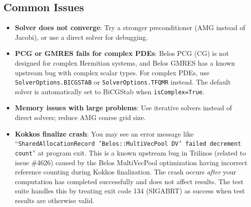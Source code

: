 \subsection{Common Issues}
\begin{itemize}
\item \textbf{Solver does not converge}: Try a stronger preconditioner (AMG instead of Jacobi), or use a direct solver for debugging.
\item \textbf{PCG or GMRES fails for complex PDEs}: Belos PCG (CG) is not designed for complex Hermitian
  systems, and Belos GMRES has a known upstream bug with complex scalar types. For complex PDEs,
  use \verb|SolverOptions.BICGSTAB| or \verb|SolverOptions.TFQMR| instead. The default solver
  is automatically set to BiCGStab when \verb|isComplex=True|.
\item \textbf{Memory issues with large problems}: Use iterative solvers instead of direct solvers; reduce AMG coarse grid size.
\item \textbf{Kokkos finalize crash}: You may see an error message like
  ``\texttt{SharedAllocationRecord 'Belos::MultiVecPool DV' failed decrement count}''
  at program exit. This is a known upstream bug in Trilinos (related to issue \#4626)
  caused by the Belos MultiVecPool optimization having incorrect reference counting
  during Kokkos finalization. The crash occurs \emph{after} your computation has
  completed successfully and does not affect results. The test suite handles this
  by treating exit code 134 (SIGABRT) as success when test results are otherwise valid.
\end{itemize}

